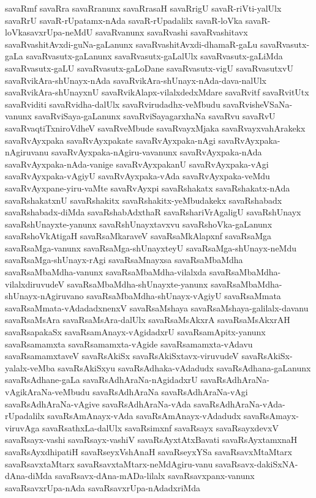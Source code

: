 {savaRmf
savaRra
savaRranunx
savaRrasaH
savaRrigU
savaR-riVti-yalUlx
savaRrU
savaR-rUpatamx-nAda
savaR-rUpadalilx
savaR-loVka
savaR-loVkasavxrUpa-neMdU
savaRvanunx
savaRvashi
savaRvashitavx
savaRvashitAvxdi-guNa-gaLanunx
savaRvashitAvxdi-dhamaR-gaLu
savaRvasutx-gaLa
savaRvasutx-gaLanunx
savaRvasutx-gaLalUlx
savaRvasutx-gaLiMda
savaRvasutx-gaLU
savaRvasutx-gaLoDane
savaRvasutx-vigU
savaRvasutxvU
savaRvikAra-shUnayx-nAda
savaRvikAra-shUnayx-nAda-dava-nalUlx
savaRvikAra-shUnayxnU
savaRvikAlapx-vilalxdedxMdare
savaRvitf
savaRvitUtx
savaRviditi
savaRvidha-dalUlx
savaRvirudadhx-veMbudu
savaRvisheVSaNa-vanunx
savaRviSaya-gaLanunx
savaRviSayagarxhaNa
savaRvu
savaRvU
savaRvaqtiTxniroVdheV
savaRveMbude
savaRvayxMjaka
savaRvayxvahArakekx
savaRvAyxpaka
savaRvAyxpakate
savaRvAyxpaka-nAgi
savaRvAyxpaka-nAgiruvanu
savaRvAyxpaka-nAgiru-vavanunx
savaRvAyxpaka-nAda
savaRvAyxpaka-nAda-vanige
savaRvAyxpakanU
savaRvAyxpaka-vAgi
savaRvAyxpaka-vAgiyU
savaRvAyxpaka-vAda
savaRvAyxpaka-veMdu
savaRvAyxpane-yiru-vaMte
savaRvAyxpi
savaRshakatx
savaRshakatx-nAda
savaRshakatxnU
savaRshakitx
savaRshakitx-yeMbudakekx
savaRshabadx
savaRshabadx-diMda
savaRshabAdxthaR
savaRshariVrAgaligU
savaRshUnayx
savaRshUnayxte-yanunx
savaRshUnayxtavxvu
savaRshoVka-gaLanunx
savaRshoVkAtigaH
savaRsaMkaraveV
savaRsaMkAlapxnf
savaRsaMga
savaRsaMga-vanunx
savaRsaMga-shUnayxteyU
savaRsaMga-shUnayx-neMdu
savaRsaMga-shUnayx-rAgi
savaRsaMnayxsa
savaRsaMbaMdha
savaRsaMbaMdha-vanunx
savaRsaMbaMdha-vilalxda
savaRsaMbaMdha-vilalxdiruvudeV
savaRsaMbaMdha-shUnayxte-yanunx
savaRsaMbaMdha-shUnayx-nAgiruvano
savaRsaMbaMdha-shUnayx-vAgiyU
savaRsaMmata
savaRsaMmata-vAdadadxnenxV
savaRsaMshaya
savaRsaMshaya-galilalx-davanu
savaRsaMsAra
savaRsaMsAra-dalUlx
savaRsaMsAkxrA
savaRsaMsAkxrAH
savaRsapakaSx
savaRsamAnayx-vAgidadxrU
savaRsamApitx-yanunx
savaRsamamxta
savaRsamamxta-vAgide
savaRsamamxta-vAdavu
savaRsamamxtaveV
savaRsAkiSx
savaRsAkiSxtavx-viruvudeV
savaRsAkiSx-yalalx-veMba
savaRsAkiSxyu
savaRsAdhaka-vAdadudx
savaRsAdhana-gaLanunx
savaRsAdhane-gaLa
savaRsAdhAraNa-nAgidadxrU
savaRsAdhAraNa-vAgikAraNa-veMbudu
savaRsAdhAraNa
savaRsAdhAraNa-vAgi
savaRsAdhAraNa-vAgive
savaRsAdhAraNa-vAda
savaRsAdhAraNa-vAda-rUpadalilx
savaRsAmAnayx-vAda
savaRsAmAnayx-vAdadudx
savaRsAmayx-viruvAga
savaRsathxLa-dalUlx
savaRsimxnf
savaRsayx
savaRsayxdevxV
savaRsayx-vashi
savaRsayx-vashiV
savaRsAyxtAtxBavati
savaRsAyxtamxnaH
savaRsAyxdhipatiH
savaRseyxVshAnaH
savaRseyxYSa
savaRsavxMtaMtarx
savaRsavxtaMtarx
savaRsavxtaMtarx-neMdAgiru-vanu
savaRsavx-dakiSxNA-dAna-diMda
savaRsavx-dAna-mADa-lilalx
savaRsavxpanx-vanunx
savaRsavxrUpa-nAda
savaRsavxrUpa-nAdadxriMda
}
